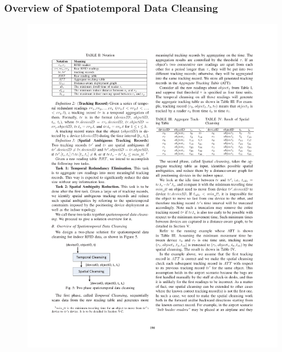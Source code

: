 
\begin{frame}
\frametitle{Overview of Spatiotemporal Data Cleansing}

\begin{figure}[tb]
  \includegraphics[width=\columnwidth]{figures/3-2/3-2-4.pdf}
\end{figure}

\end{frame}


